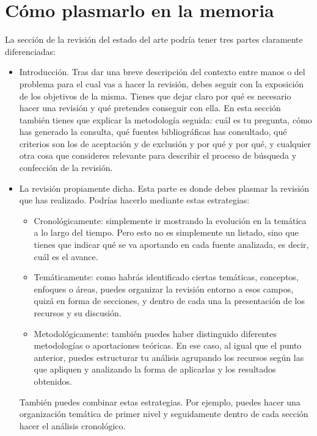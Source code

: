 \section{Cómo plasmarlo en la memoria}

La sección de la revisión del estado del arte podría tener tres partes claramente diferenciadas:

\begin{itemize}
    \item Introducción. Tras dar una breve descripción del contexto entre manos o del problema para el cual vas a hacer la revisión, debes seguir con la exposición de los objetivos de la misma.  Tienes que dejar claro por qué es necesario hacer una revisión y qué pretendes conseguir con ella. En esta sección también tienes que explicar la metodología seguida: cuál es tu pregunta, cómo has generado la consulta, qué fuentes bibliográficas has consultado, qué criterios son los de aceptación y de exclusión y por qué y por qué, y cualquier otra cosa que consideres relevante para describir el proceso de búsqueda y confección de la revisión.

    \item La revisión propiamente dicha. Esta parte es donde debes plasmar la revisión que has realizado. Podrías hacerlo mediante estas estrategias:

    \begin{itemize}
        \item Cronológicamente: simplemente ir mostrando la evolución en la temática a lo largo del tiempo. Pero esto no es simplemente un listado, sino que tienes que indicar qué se va aportando en cada fuente analizada, es decir, cuál es el avance.

        \item Temáticamente: como habrás identificado ciertas temáticas, conceptos, enfoques o áreas, puedes organizar la revisión entorno a esos campos, quizá en forma de secciones, y dentro de cada una la presentación de los recursos y su discusión.

        \item Metodológicamente: también puedes haber distinguido diferentes metodologías o aportaciones teóricas. En ese caso, al igual que el punto anterior, puedes estructurar tu análisis agrupando los recursos según las que apliquen y analizando la forma de aplicarlas y los resultados obtenidos.
    \end{itemize}
    
    También puedes combinar estas estrategias. Por ejemplo, puedes hacer una organización temática de primer nivel y seguidamente dentro de cada sección hacer el análisis cronológico.


\end{itemize}
